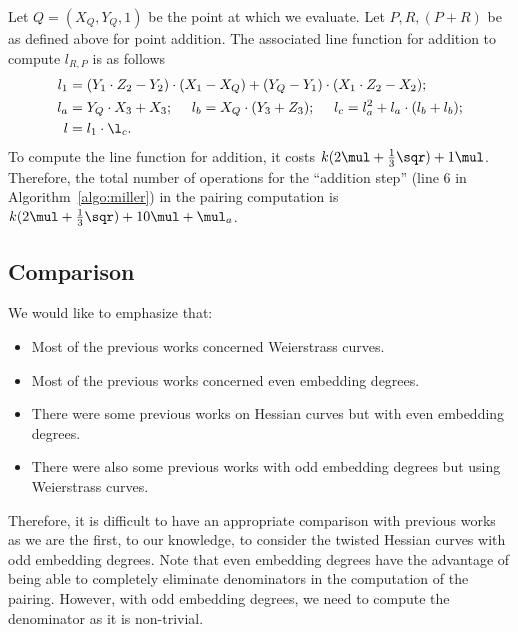 Let $Q = (X_{Q},Y_{Q},1)$ be the point at which we evaluate.
Let $P,R,(P+R)$ be as defined above for point addition.
The associated line function for addition
to compute $l_{R,P}$ is as follows
\begin{align*}
l_1 &= (Y_1 \cdot Z_2 - Y_2) \cdot (X_1 - X_{Q}) + (Y_{Q} - Y_1) \cdot (X_1 \cdot Z_2 - X_2);\\
l_a &= Y_{Q} \cdot X_3 + X_3;\	\quad
l_b = X_{Q} \cdot (Y_3 + Z_3);\	\quad
l_c = l_a^2 + l_a \cdot (l_b + l_b);\\
l &= l_1 \cdot \l_c.
\end{align*}
To compute the line function for addition,
it costs
$k(2\mul + \frac{1}{3}\sqr) + 1\mul$.
Therefore, the total number of operations for the ``addition step''
({line 6} in Algorithm~\ref{algo:miller}) in the pairing computation is
$k(2\mul + \frac{1}{3}\sqr) + 10\mul + \mul_a$.


\subsection{Comparison}

We would like to emphasize that:
\begin{itemize}
\item	Most of the previous works concerned Weierstrass curves.
\item	Most of the previous works concerned even embedding degrees.
\item	There were some previous works on Hessian curves but with even embedding degrees.
\item	There were also some previous works with odd embedding degrees but using Weierstrass curves.
\end{itemize}
Therefore, it is difficult to have an appropriate comparison with previous works
as we are the first, to our knowledge, to consider the twisted Hessian curves with odd embedding degrees.
Note that even embedding degrees have the advantage of being able to completely eliminate denominators in the computation of the pairing.
However, with odd embedding degrees, we need to compute the denominator as it is non-trivial.


